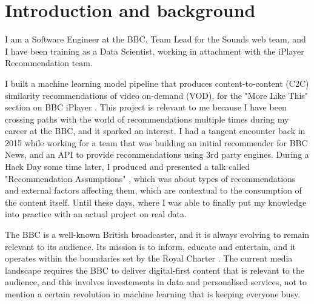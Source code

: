 
\section{Introduction and background}

I am a Software Engineer at the BBC, Team Lead for the Sounds web team, and I have been training as a Data Scientist,
working in attachment with the iPlayer Recommendation team.

I built a machine learning model pipeline that produces content-to-content (C2C) similarity recommendations
of video on-demand (VOD), for the "More Like This" section on BBC iPlayer \cite{MoreLikeBluey}.
This project is relevant to me because I have been crossing paths with the world of recommendations
multiple times during my career at the BBC, and it sparked an interest.
I had a tangent encounter back in 2015 while working for a team that was building
an initial recommender for BBC News, and an API to provide recommendations using 3rd party engines.
During a Hack Day some time later, I produced and presented a talk called
"Recommendation Assumptions" \cite{RecsAssumptions}, which was about types of recommendations and external factors affecting
them, which are contextual to the consumption of the content itself. Until these days, where I was able to finally put my knowledge into practice
with an actual project on real data.

The BBC is a well-known British broadcaster, and it is always evolving to remain relevant to its audience. Its mission
is to inform, educate and entertain, and it operates within the boundaries set by the Royal Charter \cite{RoyalCharterBBC}.
The current media landscape requires the BBC to deliver digital-first content that is relevant to the audience,
and this involves investements in data and personalised services, not to mention a certain revolution in machine learning
that is keeping everyone busy.
